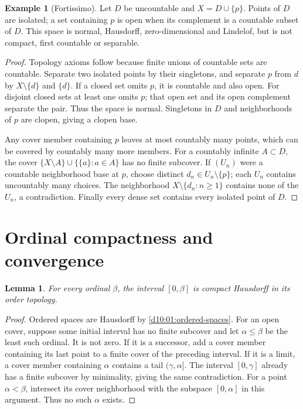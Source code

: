 \documentclass[11pt,oneside,openany]{book}
\newtheorem{lemma}[theorem]{Lemma}
\theoremstyle{definition}
\newtheorem{example}[theorem]{Example}
\theoremstyle{remark}
\begin{document}
\begin{example}[Fortissimo]\label{d10:18:fortissimo}
Let $D$ be uncountable and $X=D\cup\{p\}$. Points of $D$ are isolated;
a set containing $p$ is open when its complement is a countable
subset of $D$. This space is normal, Hausdorff, zero-dimensional
and Lindelof, but is not compact, first countable or separable.
\end{example}
\begin{proof}
Topology axioms follow because finite unions of countable sets
are countable. Separate two isolated points by their singletons,
and separate $p$ from $d$ by $X\setminus\{d\}$ and $\{d\}$.
If a closed set omits $p$, it is countable and also open.
For disjoint closed sets at least one omits $p$; that open set
and its open complement separate the pair. Thus the space is normal.
Singletons in $D$ and neighborhoods of $p$ are clopen, giving a
clopen base.

Any cover member containing $p$ leaves at most countably many
points, which can be covered by countably many more members.
For a countably infinite $A\subset D$, the cover
$\{X\setminus A\}\cup\{\{a\}:a\in A\}$ has no finite subcover.
If $(U_n)$ were a countable neighborhood base at $p$, choose
distinct $d_n\in U_n\setminus\{p\}$; each $U_n$ contains
uncountably many choices. The neighborhood $X\setminus\{d_n:n\geq1\}$
contains none of the $U_n$, a contradiction.
Finally every dense set contains every isolated point of $D$.
\end{proof}

\section{Ordinal compactness and convergence}
\begin{lemma}\label{d10:18:ordinal-compact}
For every ordinal $\beta$, the interval $[0,\beta]$ is compact
Hausdorff in its order topology.
\end{lemma}
\begin{proof}
Ordered spaces are Hausdorff by \cref{d10:01:ordered-spaces}.
For an open cover, suppose some initial interval has no finite
subcover and let $\alpha\leq\beta$ be the least such ordinal.
It is not zero. If it is a successor, add a cover member containing
its last point to a finite cover of the preceding interval.
If it is a limit, a cover member containing $\alpha$ contains a
tail $(\gamma,\alpha]$. The interval $[0,\gamma]$ already has a
finite subcover by minimality, giving the same contradiction.
For a point $\alpha<\beta$, intersect its cover neighborhood with
the subspace $[0,\alpha]$ in this argument.
Thus no such $\alpha$ exists.
\end{proof}
\end{document}
